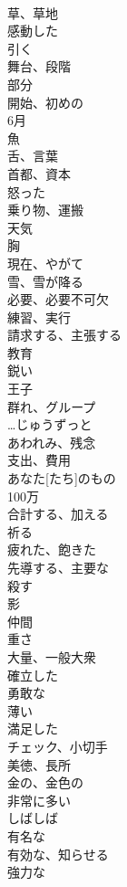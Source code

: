 \documentclass[8pt]{extreport}
\begin{document}
\begin{CJK}{UTF8}{min}
\\	草、草地	
\\	感動した	
\\	引く	
\\	舞台、段階	
\\	部分	
\\	開始、初めの	
\\	6月	
\\	魚	
\\	舌、言葉	
\\	首都、資本	
\\	怒った	
\\	乗り物、運搬	
\\	天気	
\\	胸	
\\	現在、やがて	
\\	雪、雪が降る	
\\	必要、必要不可欠	
\\	練習、実行	
\\	請求する、主張する	
\\	教育	
\\	鋭い	
\\	王子	
\\	群れ、グループ	
\\	…じゅうずっと	
\\	あわれみ、残念	
\\	支出、費用	
\\	あなた[たち]のもの	
\\	100万	
\\	合計する、加える	
\\	祈る	
\\	疲れた、飽きた	
\\	先導する、主要な	
\\	殺す	
\\	影	
\\	仲間	
\\	重さ	
\\	大量、一般大衆	
\\	確立した	
\\	勇敢な	
\\	薄い	
\\	満足した	
\\	チェック、小切手	
\\	美徳、長所	
\\	金の、金色の	
\\	非常に多い	
\\	しばしば	
\\	有名な	
\\	有効な、知らせる	
\\	強力な	

\end{CJK}
\end{document}

